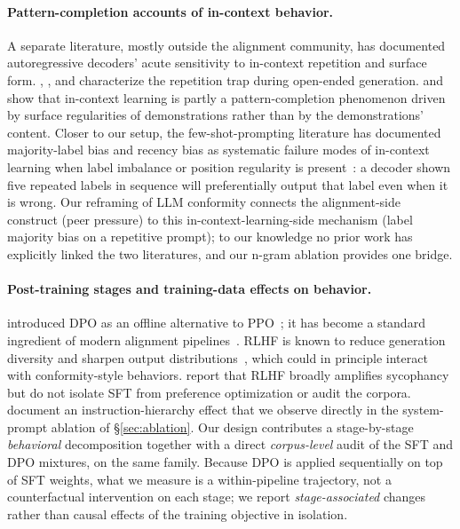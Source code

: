 \documentclass{article}
\begin{document}
\paragraph{Pattern-completion accounts of in-context behavior.}
A separate literature, mostly outside the alignment community, has documented autoregressive decoders' acute sensitivity to in-context repetition and surface form. \citet{holtzman2020curious}, \citet{welleck2020unlikelihood}, and \citet{fu2021theoretical} characterize the repetition trap during open-ended generation. \citet{min2022rethinking} and \citet{shi2023large} show that in-context learning is partly a pattern-completion phenomenon driven by surface regularities of demonstrations rather than by the demonstrations' content. Closer to our setup, the few-shot-prompting literature has documented majority-label bias and recency bias as systematic failure modes of in-context learning when label imbalance or position regularity is present~\citep{zhao2021calibrate, lu2022fantastically}: a decoder shown five repeated labels in sequence will preferentially output that label even when it is wrong. Our reframing of LLM conformity connects the alignment-side construct (peer pressure) to this in-context-learning-side mechanism (label majority bias on a repetitive prompt); to our knowledge no prior work has explicitly linked the two literatures, and our n-gram ablation provides one bridge.

\paragraph{Post-training stages and training-data effects on behavior.}
\citet{rafailov2023dpo} introduced DPO as an offline alternative to PPO~\citep{schulman2017ppo}; it has become a standard ingredient of modern alignment pipelines~\citep{olmo3, meta2024llama3, meta2025llama4}. RLHF is known to reduce generation diversity and sharpen output distributions~\citep{rlhf_entropy}, which could in principle interact with conformity-style behaviors. \citet{sharma2024sycophancy} report that RLHF broadly amplifies sycophancy but do not isolate SFT from preference optimization or audit the corpora. \citet{wallace2024instruction} document an instruction-hierarchy effect that we observe directly in the system-prompt ablation of \S\ref{sec:ablation}. Our design contributes a stage-by-stage \emph{behavioral} decomposition together with a direct \emph{corpus-level} audit of the SFT and DPO mixtures, on the same family. Because DPO is applied sequentially on top of SFT weights, what we measure is a within-pipeline trajectory, not a counterfactual intervention on each stage; we report \emph{stage-associated} changes rather than causal effects of the training objective in isolation.
\end{document}
